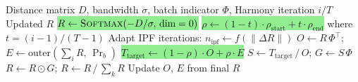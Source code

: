 \documentclass[8pt]{article}
\begin{document}
\vspace{4pt}

\begin{tcolorbox}[
    title={\textbf{Algorithm 1b:} harmony\_272 --- Iterative Proportional Fitting (IPF)},
    colback=lightgreen!20, colframe=added!80, fonttitle=\small\bfseries,
    boxrule=0.5pt, arc=2pt, left=4pt, right=4pt, top=2pt, bottom=2pt
]
\begin{algorithmic}[1]
\small
\Require Distance matrix $D$, bandwidth $\sigma$, batch indicator $\Phi$, Harmony iteration $i/T$
\Ensure Updated $R$
\State \colorbox{lightgreen}{$R \gets \textsc{Softmax}(-D / \sigma, \, \text{dim}=0)$} \Comment{\textcolor{added}{Stable softmax (no block shuffle)}}
\State \colorbox{lightgreen}{$\rho \gets (1 - t) \cdot \rho_{\text{start}} + t \cdot \rho_{\text{end}}$} where $t = (i-1)/(T-1)$ \Comment{\textcolor{added}{Annealing schedule}}
\State Adapt IPF iterations: $n_{\text{ipf}} \gets f(\|\Delta R\|)$ 
    \State $O \gets R \, \Phi^\top$; \quad $E \gets \text{outer}(\sum_i R, \, \Pr_b)$
    \State \colorbox{lightgreen}{$T_{\text{target}} \gets (1 - \rho) \cdot O + \rho \cdot E$} \Comment{\textcolor{added}{Soft batch-balance target}}
    \State $S \gets T_{\text{target}} \,/\, O$; \quad $G \gets S \, \Phi$ 
    \State $R \gets R \odot G$; \quad $R \gets R \,/\, \sum_k R$ 
\EndFor
\State Update $O$, $E$ from final $R$
\end{algorithmic}
\end{tcolorbox}

\vspace{4pt}
\end{document}
